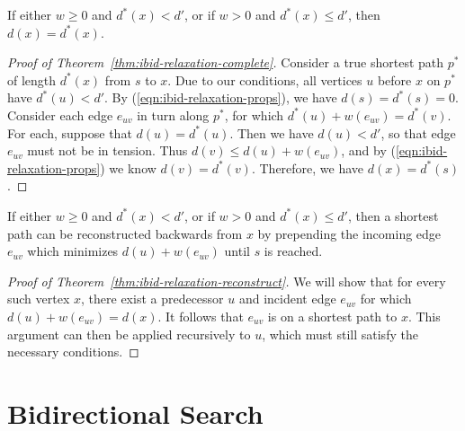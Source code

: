 \begin{theorem}
If either $w \geq 0$ and $d^*(x) < d'$,
or if $w > 0$ and $d^*(x) \leq d'$,
then $d(x) = d^*(x)$.
\label{thm:ibid-relaxation-complete}
\end{theorem}

\begin{proof}[Proof of Theorem~\ref{thm:ibid-relaxation-complete}]
Consider a true shortest path $p^*$ of length $d^*(x)$ from $s$ to $x$.
Due to our conditions,
all vertices $u$ before $x$ on $p^*$ have $d^*(u) < d'$.
By (\ref{eqn:ibid-relaxation-props}),
we have $d(s) = d^*(s) = 0$.
Consider each edge $e_{uv}$ in turn along $p^*$,
for which $d^*(u) + w(e_{uv}) = d^*(v)$.
For each, suppose that $d(u) = d^*(u)$.
Then we have $d(u) < d'$,
so that edge $e_{uv}$ must not be in tension.
Thus $d(v) \leq d(u) + w(e_{uv})$,
and by (\ref{eqn:ibid-relaxation-props}) we know $d(v) = d^*(v)$.
Therefore, we have $d(x) = d^*(s)$.
\end{proof}

\begin{theorem}
If either $w \geq 0$ and $d^*(x) < d'$,
or if $w > 0$ and $d^*(x) \leq d'$,
then a shortest path can be reconstructed backwards from $x$
by prepending the incoming edge $e_{uv}$ which minimizes
$d(u) + w(e_{uv})$ until $s$ is reached.
\label{thm:ibid-relaxation-reconstruct}
\end{theorem}

\begin{proof}[Proof of Theorem~\ref{thm:ibid-relaxation-reconstruct}]
We will show that for every such vertex $x$,
there exist a predecessor $u$ and incident edge $e_{uv}$
for which $d(u) + w(e_{uv}) = d(x)$.
It follows that $e_{uv}$ is on a shortest path to $x$.
This argument can then be applied recursively to $u$,
which must still satisfy the necessary conditions.
\end{proof}

\section{Bidirectional Search}
\label{sec:ibid:bidirectional}

